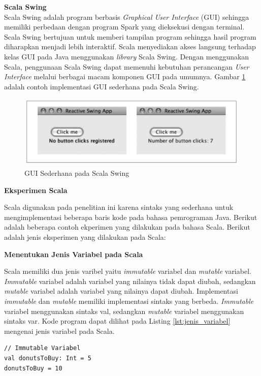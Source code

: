 \documentclass[a4paper,twoside]{article}
\begin{document}
\begin{enumerate}
\textbf{Scala Swing}\\
Scala Swing adalah program berbasis \textit{Graphical User Interface} (GUI) sehingga memiliki perbedaan dengan program Spark yang dieksekusi dengan terminal. Scala Swing bertujuan untuk memberi tampilan program sehingga hasil program diharapkan menjadi lebih interaktif. Scala menyediakan akses langsung terhadap kelas GUI pada Java menggunakan \textit{library} Scala Swing.  Dengan menggunakan Scala, penggunaan Scala Swing dapat memenuhi kebutuhan perancangan \textit{User Interface} melalui berbagai macam komponen GUI pada umumnya. Gambar \ref{fig:swing_example} adalah contoh implementasi GUI sederhana pada Scala Swing.

\begin{figure}[H]
	\centering
	\includegraphics[scale=0.8]{swing_example}
	\caption{GUI Sederhana pada Scala Swing}
	\label{fig:swing_example}
\end{figure}

\textbf{Eksperimen Scala}

Scala digunakan pada penelitian ini karena sintaks yang sederhana untuk mengimplementasi beberapa baris kode pada bahasa pemrograman Java. Berikut adalah beberapa contoh ekperimen yang dilakukan pada bahasa Scala. Berikut adalah jenis eksperimen yang dilakukan pada Scala:

\textbf{Menentukan Jenis Variabel pada Scala}

Scala memiliki dua jenis varibel yaitu \textit{immutable} variabel dan \textit{mutable} variabel. \textit{Immutable} variabel adalah variabel yang nilainya tidak dapat diubah, sedangkan \textit{mutable} variabel adalah variabel yang nilainya dapat diubah. Implementasi \textit{immutable} dan \textit{mutable} memiliki implementasi sintaks yang berbeda. \textit{Immutable} variabel menggunakan sintaks val, sedangkan \textit{mutable} variabel menggunakan sintaks var. Kode program dapat dilihat pada Listing \ref{lst:jenis_variabel} mengenai jenis variabel pada Scala. 

\begin{lstlisting}[basicstyle=\ttfamily, frame=single,
	columns=fullflexible, keepspaces=true, breaklines=true, label=lst:jenis_variabel, caption=Menentukan Jenis Variabel pada Scala]
// Immutable Variabel
val donutsToBuy: Int = 5
donutsToBuy = 10


\end{lstlisting}
\end{enumerate}
\end{document}
